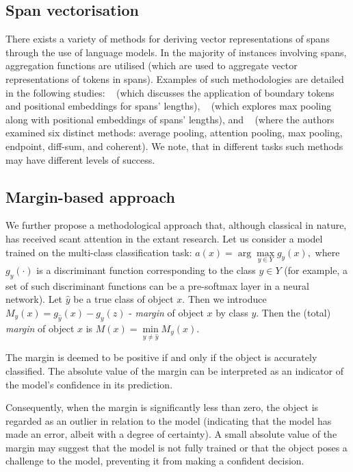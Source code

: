 \documentclass{article}
\begin{document}
\subsection{Span vectorisation}\label{span-vec}
There exists a variety of methods for deriving vector representations of spans through the use of language models. In the majority of instances involving spans, aggregation functions are utilised (which are used to aggregate vector representations of tokens in spans). Examples of such methodologies are detailed in the following studies: ~\cite{joshi2020spanbert} (which discusses the application of boundary tokens and positional embeddings for spans' lengths), ~\cite{eberts2020span} (which explores max pooling along with positional embeddings of spans' lengths), and ~\cite{toshniwal2020cross} (where the authors examined six distinct methods: average pooling, attention pooling, max pooling, endpoint, diff-sum, and coherent). We note, that in different tasks such methods may have different levels of success. 

\subsection{Margin-based approach}
We further propose a methodological approach that, although classical in nature, has received scant attention in the extant research. Let us consider a model trained on the multi-class classification task: $a(x) = \arg\max\limits_{y \in Y}g_y(x),$ where $g_y(\cdot)$ is a discriminant function corresponding to the class $y \in Y$ (for example, a set of such discriminant functions can be a pre-softmax layer in a neural network). Let $\hat{y}$ be a true class of object $x$. Then we introduce $M_y(x) = g_{\hat{y}}(x) - g_y(z)$ - \emph{margin} of object $x$ by class $y$. Then the (total) \emph{margin} of object $x$ is $M(x) = \min\limits_{y \neq \hat{y}}M_y(x)$.

The margin is deemed to be positive if and only if the object is accurately classified. The absolute value of the margin can be interpreted as an indicator of the model's confidence in its prediction.

Consequently, when the margin is significantly less than zero, the object is regarded as an outlier in relation to the model (indicating that the model has made an error, albeit with a degree of certainty). A small absolute value of the margin may suggest that the model is not fully trained or that the object poses a challenge to the model, preventing it from making a confident decision.
\end{document}

